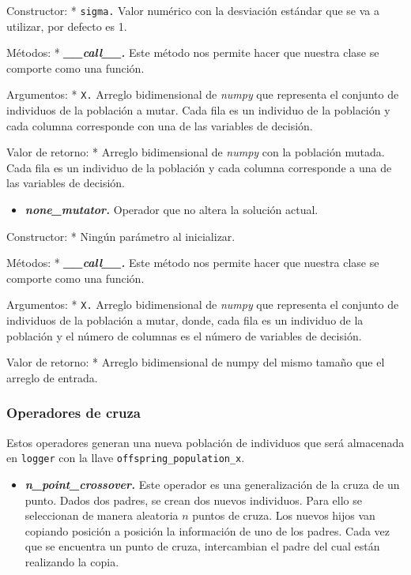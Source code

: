 \documentclass[11pt]{article}
\providecommand{\tightlist}{%
      \setlength{\itemsep}{0pt}\setlength{\parskip}{0pt}}
\begin{document}
Constructor: * \texttt{sigma.} Valor numérico con la desviación estándar
que se va a utilizar, por defecto es 1.

Métodos: * \emph{\textbf{\_\_call\_\_.}} Este método nos permite hacer
que nuestra clase se comporte como una función.

Argumentos: * \texttt{X.} Arreglo bidimensional de \emph{numpy} que
representa el conjunto de individuos de la población a mutar. Cada fila
es un individuo de la población y cada columna corresponde con una de
las variables de decisión.

Valor de retorno: * Arreglo bidimensional de \emph{numpy} con la
población mutada. Cada fila es un individuo de la población y cada
columna corresponde a una de las variables de decisión.

    \begin{itemize}
\tightlist
\item
  \emph{\textbf{none\_mutator.}} Operador que no altera la solución
  actual.
\end{itemize}

Constructor: * Ningún parámetro al inicializar.

Métodos: * \emph{\textbf{\_\_call\_\_.}} Este método nos permite hacer
que nuestra clase se comporte como una función.

Argumentos: * \texttt{X.} Arreglo bidimensional de \emph{numpy} que
representa el conjunto de individuos de la población a mutar, donde,
cada fila es un individuo de la población y el número de columnas es el
número de variables de decisión.

Valor de retorno: * Arreglo bidimensional de numpy del mismo tamaño que
el arreglo de entrada.

    \subsubsection{Operadores de cruza}\label{operadores-de-cruza}

    Estos operadores generan una nueva población de individuos que será
almacenada en \texttt{logger} con la llave
\texttt{offspring\_population\_x}.

    \begin{itemize}
\tightlist
\item
  \emph{\textbf{n\_point\_crossover.}} Este operador es una
  generalización de la cruza de un punto. Dados dos padres, se crean dos
  nuevos individuos. Para ello se seleccionan de manera aleatoria \(n\)
  puntos de cruza. Los nuevos hijos van copiando posición a posición la
  información de uno de los padres. Cada vez que se encuentra un punto
  de cruza, intercambian el padre del cual están realizando la copia.
\end{itemize}
\end{document}
